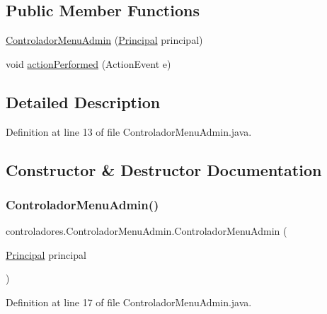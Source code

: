\subsection*{Public Member Functions}
\begin{DoxyCompactItemize}
\item 
\mbox{\hyperlink{classcontroladores_1_1_controlador_menu_admin_a12c2b360472a2aa24c7ca77751a3880c}{Controlador\+Menu\+Admin}} (\mbox{\hyperlink{classvistas_1_1_principal}{Principal}} principal)
\item 
void \mbox{\hyperlink{classcontroladores_1_1_controlador_menu_admin_a82d2cd7e031a45484fdf83e50a82cf1e}{action\+Performed}} (Action\+Event e)
\end{DoxyCompactItemize}


\subsection{Detailed Description}


Definition at line 13 of file Controlador\+Menu\+Admin.\+java.



\subsection{Constructor \& Destructor Documentation}
\mbox{\label{classcontroladores_1_1_controlador_menu_admin_a12c2b360472a2aa24c7ca77751a3880c}} 
\subsubsection{\texorpdfstring{Controlador\+Menu\+Admin()}{ControladorMenuAdmin()}}
{\footnotesize\ttfamily controladores.\+Controlador\+Menu\+Admin.\+Controlador\+Menu\+Admin (\begin{DoxyParamCaption}\item[{\mbox{\hyperlink{classvistas_1_1_principal}{Principal}}}]{principal }\end{DoxyParamCaption})}



Definition at line 17 of file Controlador\+Menu\+Admin.\+java.



